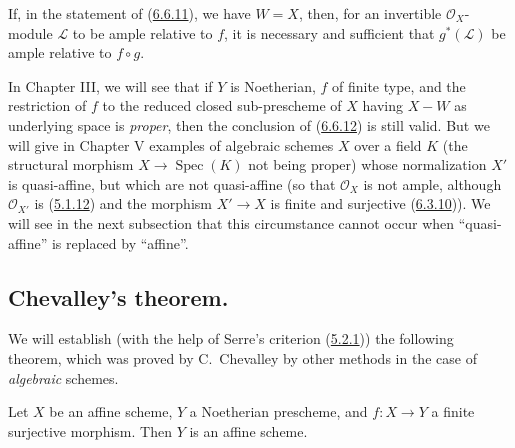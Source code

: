 \begin{corollary}[6.6.12]
\label{II.6.6.12}
If, in the statement of (\hyperref[II.6.6.11]{6.6.11}), we have $W=X$, then,
for an invertible $\mathcal{O}_X$-module $\mathcal{L}$ to be ample
relative to $f$, it is necessary and sufficient that $g^*(\mathcal{L})$ be
ample relative to $f\circ g$.
\end{corollary}

\begin{remark}[6.6.13]
\label{II.6.6.13}
In Chapter III, we will see that if $Y$ is Noetherian, $f$ of finite type,
and the restriction of $f$ to the reduced closed sub-prescheme of $X$ having
$X-W$ as underlying space is \emph{proper}, then the conclusion of
(\hyperref[II.6.6.12]{6.6.12}) is still valid. But we will give in
Chapter V examples of algebraic schemes $X$ over a field $K$ (the
structural morphism $X\to\operatorname{Spec}(K)$ not being proper) whose
normalization $X'$ is quasi-affine, but which are not quasi-affine (so
that $\mathcal{O}_X$ is not ample, although $\mathcal{O}_{X'}$ is
(\hyperref[II.5.1.12]{5.1.12}) and the morphism $X'\to X$ is finite
and surjective (\hyperref[II.6.3.10]{6.3.10})). We will see in the next
subsection that this circumstance cannot occur when
``quasi-affine'' is replaced by ``affine''.
\end{remark}

\subsection{Chevalley's theorem.}
\label{subsection:II.6.7}

We will establish (with the help of Serre's criterion
(\hyperref[II.5.2.1]{5.2.1})) the following theorem, which was proved by
C.~Chevalley by other methods in the case of \emph{algebraic}
schemes.


\begin{theorem}[6.7.1]
\label{II.6.7.1}
Let $X$ be an affine scheme, $Y$ a Noetherian prescheme, and $f:X\to Y$ a
finite surjective morphism. Then $Y$ is an affine scheme.
\end{theorem}

